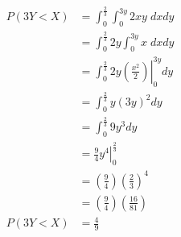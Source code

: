 \begin{align*}
    P(3Y<X) & = \int_0^\frac{2}{3} \int_0^{3y} 2xy \; dxdy                            \\
            & =\int_0^\frac{2}{3}2y \int_0^{3y} x \; dxdy                             \\
            & = \int_0^\frac{2}{3}2y \left.\left(\frac{x^2}{2}\right)\right|_0^{3y}dy \\
            & =\int_0^\frac{2}{3}y (3y)^2dy                                           \\
            & = \int_0^\frac{2}{3} 9y^3 dy                                            \\
            & = \left.\frac{9}{4} y^4 \right|_0^\frac{2}{3}                           \\
            & = \left(\frac{9}{4}\right) \left(\frac{2}{3}\right)^4                   \\
            & = \left(\frac{9}{4}\right) \left(\frac{16}{81}\right)                   \\
    P(3Y<X) & = \frac{4}{9}
\end{align*}
